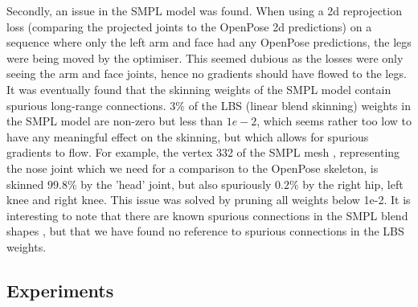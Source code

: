 Secondly, an issue in the SMPL model was found. When using a 2d reprojection loss (comparing the projected joints to the OpenPose 2d predictions) on a sequence where only the left arm and face had any OpenPose predictions, the legs were being moved by the optimiser. This seemed dubious as the losses were only seeing the arm and face joints, hence no gradients should have flowed to the legs. It was eventually found that the skinning weights of the SMPL model \cite{SMPL} contain spurious long-range connections. 3\% of the LBS (linear blend skinning) weights in the SMPL model are non-zero but less than $1e-2$, which seems rather too low to have any meaningful effect on the skinning, but which allows for spurious gradients to flow. For example, the vertex 332 of the SMPL mesh \cite{SMPL_op_joints}, representing the nose joint which we need for a comparison to the OpenPose skeleton, is skinned $99.8\%$ by the 'head' joint, but also spuriously $0.2\%$ by the right hip, left knee and right knee. This issue was solved by pruning all weights below 1e-2. It is interesting to note that there are known spurious connections in the SMPL blend shapes \cite{STAR}, but that we have found no reference to spurious connections in the LBS weights. 
\\













\subsection{Experiments}

